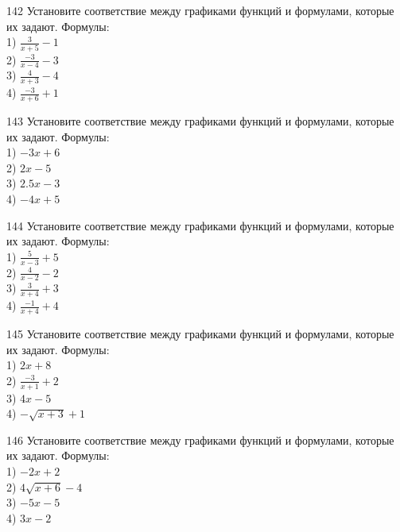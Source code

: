 \documentclass[4apaper]{article}
\begin{document}
\begin{taskBN}{142}
Установите соответствие между графиками функций и формулами, которые их задают. Формулы: \\1) $\frac{3}{x+5}-1$\\2) $\frac{-3}{x-4}-3$\\3) $\frac{4}{x+3}-4$\\4) $\frac{-3}{x+6}+1$
\end{taskBN}

\begin{taskBN}{143}
Установите соответствие между графиками функций и формулами, которые их задают. Формулы: \\1) $-3x+6$\\2) $2x-5$\\3) $2.5x-3$\\4) $-4x+5$
\end{taskBN}

\begin{taskBN}{144}
Установите соответствие между графиками функций и формулами, которые их задают. Формулы: \\1) $\frac{5}{x-3}+5$\\2) $\frac{4}{x-2}-2$\\3) $\frac{3}{x+4}+3$\\4) $\frac{-1}{x+4}+4$
\end{taskBN}

\begin{taskBN}{145}
Установите соответствие между графиками функций и формулами, которые их задают. Формулы: \\1) $2x+8$\\2) $\frac{-3}{x+1}+2$\\3) $4x-5$\\4) $-\sqrt{x+3}+1$
\end{taskBN}

\begin{taskBN}{146}
Установите соответствие между графиками функций и формулами, которые их задают. Формулы: \\1) $-2x+2$\\2) $4\sqrt{x+6}-4$\\3) $-5x-5$\\4) $3x-2$
\end{taskBN}
\end{document}
